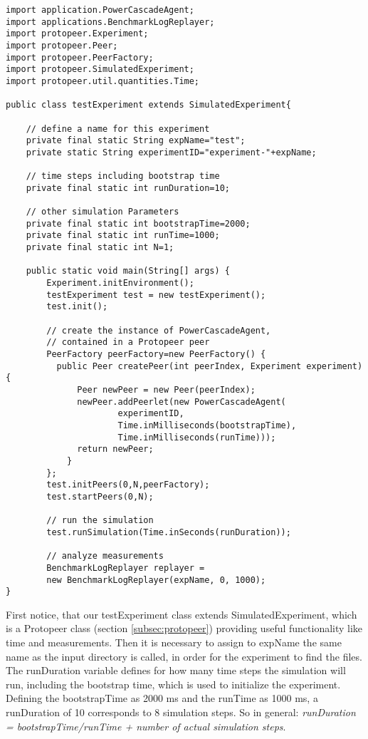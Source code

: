\documentclass[11pt,fleqn]{book} %
\begin{document}
	\begin{lstlisting}[frame=single] 
import application.PowerCascadeAgent;
import applications.BenchmarkLogReplayer;
import protopeer.Experiment;
import protopeer.Peer;
import protopeer.PeerFactory;
import protopeer.SimulatedExperiment;
import protopeer.util.quantities.Time;

public class testExperiment extends SimulatedExperiment{    

    // define a name for this experiment
    private final static String expName="test";    
    private static String experimentID="experiment-"+expName;
    
    // time steps including bootstrap time
    private final static int runDuration=10;

    // other simulation Parameters
    private final static int bootstrapTime=2000;
    private final static int runTime=1000;
    private final static int N=1;
    
    public static void main(String[] args) {
        Experiment.initEnvironment();
        testExperiment test = new testExperiment();
        test.init();
        
        // create the instance of PowerCascadeAgent, 
        // contained in a Protopeer peer
        PeerFactory peerFactory=new PeerFactory() {
          public Peer createPeer(int peerIndex, Experiment experiment){
              Peer newPeer = new Peer(peerIndex);
              newPeer.addPeerlet(new PowerCascadeAgent(
                      experimentID, 
                      Time.inMilliseconds(bootstrapTime),
                      Time.inMilliseconds(runTime)));
              return newPeer;
            }
        };
        test.initPeers(0,N,peerFactory);
        test.startPeers(0,N);

        // run the simulation
        test.runSimulation(Time.inSeconds(runDuration));

        // analyze measurements
        BenchmarkLogReplayer replayer =
        new BenchmarkLogReplayer(expName, 0, 1000);
}
	\end{lstlisting}
First notice, that our testExperiment class extends SimulatedExperiment, which is a Protopeer class (section \ref{subsec:protopeer}) providing useful functionality like time and measurements. Then it is necessary to assign to expName the same name as the input directory is called, in order for the experiment to find the files. The runDuration variable defines for how many time steps the simulation will run, including the bootstrap time, which is used to initialize the experiment. Defining the bootstrapTime as 2000 ms and the runTime as 1000 ms, a runDuration of 10 corresponds to 8 simulation steps. So in general: \textit{runDuration = bootstrapTime/runTime + number of actual simulation steps}. 
\end{document}
